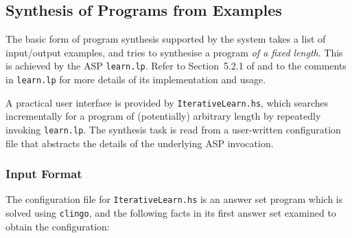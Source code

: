 \documentclass[a4paper,twoside,notitlepage,12pt]{article}
\begin{document}
\subsection{Synthesis of Programs from Examples} \label{sec:syx}

The basic form of program synthesis supported by the system takes a list of 
input/output examples, and tries to synthesise a program \emph{of a fixed length}.
This is achieved by the ASP \verb|learn.lp|. Refer to Section~5.2.1 of 
\cite{final} and to the comments in \verb|learn.lp| for more details of its 
implementation and usage.

A practical user interface is provided by \verb|IterativeLearn.hs|, which 
searches incrementally for a program of (potentially) arbitrary length by 
repeatedly invoking \verb|learn.lp|. The synthesis task is read from a 
user-written configuration file that abstracts the details of the underlying 
ASP invocation.

\subsubsection{Input Format} \label{sec:syx:inp}

The configuration file for \verb|IterativeLearn.hs| is an answer set program 
which is solved using \verb|clingo|, and the following facts in its first 
answer set examined to obtain the configuration:
\end{document}
